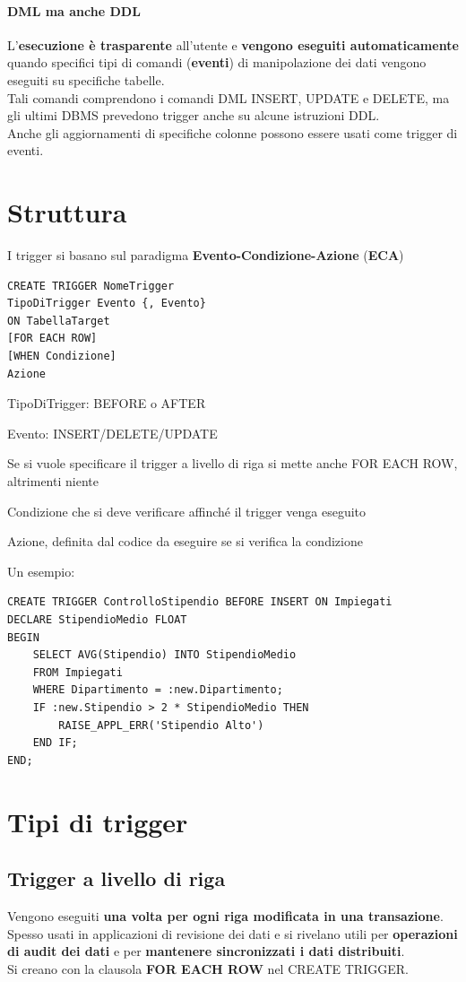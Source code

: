 \documentclass[10pt]{book}
\begin{document}
\paragraph{DML ma anche DDL} L'\textbf{esecuzione è trasparente} all'utente e \textbf{vengono eseguiti automaticamente} quando specifici tipi di comandi (\textbf{eventi}) di manipolazione dei dati vengono eseguiti su specifiche tabelle.\\
Tali comandi comprendono i comandi DML INSERT, UPDATE e DELETE, ma gli ultimi DBMS prevedono trigger anche su alcune istruzioni DDL.\\
Anche gli aggiornamenti di specifiche colonne possono essere usati come trigger di eventi.
\section{Struttura}
I trigger si basano sul paradigma \textbf{Evento-Condizione-Azione} (\textbf{ECA})
\begin{lstlisting}
CREATE TRIGGER NomeTrigger
TipoDiTrigger Evento {, Evento}
ON TabellaTarget
[FOR EACH ROW]
[WHEN Condizione]
Azione
\end{lstlisting}
\begin{list}{}{}
	\item TipoDiTrigger: BEFORE o AFTER
	\item Evento: INSERT/DELETE/UPDATE
	\item Se si vuole specificare il trigger a livello di riga si mette anche FOR EACH ROW, altrimenti niente
	\item Condizione che si deve verificare affinché il trigger venga eseguito
	\item Azione, definita dal codice da eseguire se si verifica la condizione
\end{list}
Un esempio:
\begin{lstlisting}
CREATE TRIGGER ControlloStipendio BEFORE INSERT ON Impiegati
DECLARE StipendioMedio FLOAT
BEGIN
	SELECT AVG(Stipendio) INTO StipendioMedio
	FROM Impiegati
	WHERE Dipartimento = :new.Dipartimento;
	IF :new.Stipendio > 2 * StipendioMedio THEN
		RAISE_APPL_ERR('Stipendio Alto')
	END IF;
END;
\end{lstlisting}
\section{Tipi di trigger}
\subsection{Trigger a livello di riga}
Vengono eseguiti \textbf{una volta per ogni riga modificata in una transazione}. Spesso usati in applicazioni di revisione dei dati e si rivelano utili per \textbf{operazioni di audit dei dati} e per \textbf{mantenere sincronizzati i dati distribuiti}.\\
Si creano con la clausola \textbf{FOR EACH ROW} nel CREATE TRIGGER.
\end{document}
